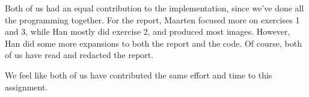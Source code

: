 \addtocounter{exerciseCount}{1} \noindent {} \par
Both of us had an equal contribution to the implementation, since we've done all the programming together.
For the report, Maarten focused more on exercises 1 and 3, while Han mostly did exercise 2, and produced most images.
However, Han did some more expansions to both the report and the code.
Of course, both of us have read and redacted the report.

We feel like both of us have contributed the same effort and time to this assignment.